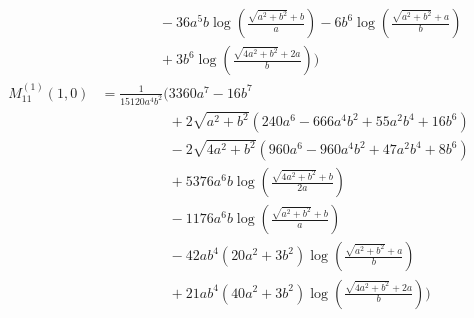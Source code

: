 \begin{align*}
&\phantom{{}=\frac{1}{720 a^{3} b^{2}}\Bigg(}- 36 a^{5} b \log\left(\frac{\sqrt{a^{2} + b^{2}} + b}{a}\right) - 6 b^{6} \log\left(\frac{\sqrt{a^{2} + b^{2}} + a}{b}\right)\\
&\phantom{{}=\frac{1}{720 a^{3} b^{2}}\Bigg(}+ 3 b^{6} \log\left(\frac{\sqrt{4 a^{2} + b^{2}} + 2 a}{b}\right)\Bigg)\\[1.2ex]
M^{(1)}_{11}(1,0) &= \frac{1}{15120 a^{4} b^{2}}\Bigg(3360 a^{7} - 16 b^{7}\\
&\phantom{{}=\frac{1}{15120 a^{4} b^{2}}\Bigg(}+ 2 \sqrt{a^{2} + b^{2}}\left(240 a^{6} - 666 a^{4} b^{2} + 55 a^{2} b^{4} + 16 b^{6}\right)\\
&\phantom{{}=\frac{1}{15120 a^{4} b^{2}}\Bigg(}- 2 \sqrt{4 a^{2} + b^{2}}\left(960 a^{6} - 960 a^{4} b^{2} + 47 a^{2} b^{4} + 8 b^{6}\right)\\
&\phantom{{}=\frac{1}{15120 a^{4} b^{2}}\Bigg(}+ 5376 a^{6} b \log\left(\frac{\sqrt{4 a^{2} + b^{2}} + b}{2 a}\right)\\
&\phantom{{}=\frac{1}{15120 a^{4} b^{2}}\Bigg(}- 1176 a^{6} b \log\left(\frac{\sqrt{a^{2} + b^{2}} + b}{a}\right)\\
&\phantom{{}=\frac{1}{15120 a^{4} b^{2}}\Bigg(}- 42 a b^{4} \left(20 a^{2} + 3 b^{2}\right) \log\left(\frac{\sqrt{a^{2} + b^{2}} + a}{b}\right)\\
&\phantom{{}=\frac{1}{15120 a^{4} b^{2}}\Bigg(}+ 21 a b^{4} \left(40 a^{2} + 3 b^{2}\right) \log\left(\frac{\sqrt{4 a^{2} + b^{2}} + 2 a}{b}\right)\Bigg)
\end{align*}
